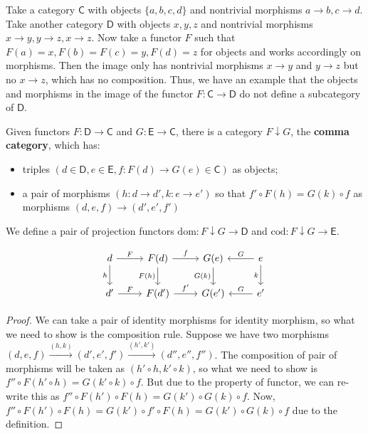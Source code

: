 \begin{exmp} Take a category $\mathsf{C}$ with objects $\{a,b,c,d\}$ and nontrivial morphisms $a\rightarrow b, c\rightarrow d$. Take another category $\mathsf{D}$ with objects $x,y,z$ and nontrivial morphisms $x\rightarrow y, y\rightarrow z, x\rightarrow z$. Now take a functor $F$ such that $F(a)=x, F(b)=F(c)=y, F(d)=z$ for objects and works accordingly on morphisms. Then the image only has nontrivial morphisms $x\rightarrow y$ and $y\rightarrow z$ but no $x\rightarrow z$, which has no composition. Thus, we have an example that the objects and morphisms in the image of the functor $F:\mathsf{C}\rightarrow \mathsf{D}$ do not define a subcategory of $\mathsf{D}$.
\end{exmp}

\begin{prop}Given functors $F:\mathsf{D}\rightarrow \mathsf{C}$ and $G:\mathsf{E}\rightarrow \mathsf{C}$, there is a category $F\downarrow G$, the \textbf{comma category}, which has:
\begin{itemize}
\item triples $(d\in\mathsf{D}, e\in\mathsf{E},f:F(d)\rightarrow G(e)\in\mathsf{C})$ as objects;
\item a pair of morphisms $(h:d\rightarrow d',k:e\rightarrow e')$ so that $f'\circ F(h)=G(k)\circ f$ as morphisms $(d,e,f)\rightarrow (d',e',f')$
\end{itemize}
We define a pair of projection functors $\mathrm{dom}:F\downarrow G\rightarrow \mathsf{D}$ and $\mathrm{cod}:F\downarrow G\rightarrow \mathsf{E}$.

\begin{equation}
\begin{tikzcd}
d\arrow{r}{F} \arrow[swap]{d}{h} & F(d)\arrow{r}{f} \arrow[swap]{d}{F(h)} & G(e)\arrow[swap]{d}{G(k)} & e\arrow[swap]{l}{G} \arrow[swap]{d}{k}\\
d'\arrow{r}{F} & F(d')\arrow{r}{f'} & G(e')& e'\arrow[swap]{l}{G}
\end{tikzcd}
\end{equation}
\end{prop} 
\begin{proof} We can take a pair of identity morphisms for identity morphism, so what we need to show is the composition rule. Suppose we have two morphisms $(d,e,f)\xrightarrow{(h,k)}(d',e',f')\xrightarrow{(h',k')}(d'',e'',f'')$. The composition of pair of morphisms will be taken as $(h'\circ h,k'\circ k)$, so what we need to show is $f''\circ F(h'\circ h)=G(k'\circ k)\circ f$. But due to the property of functor, we can re-write this as $f''\circ F(h')\circ F(h)=G(k')\circ G(k)\circ f$. Now, $f''\circ F(h')\circ F(h)=G(k')\circ f'\circ F(h)=G(k')\circ G(k)\circ f$ due to the definition.
\end{proof}

